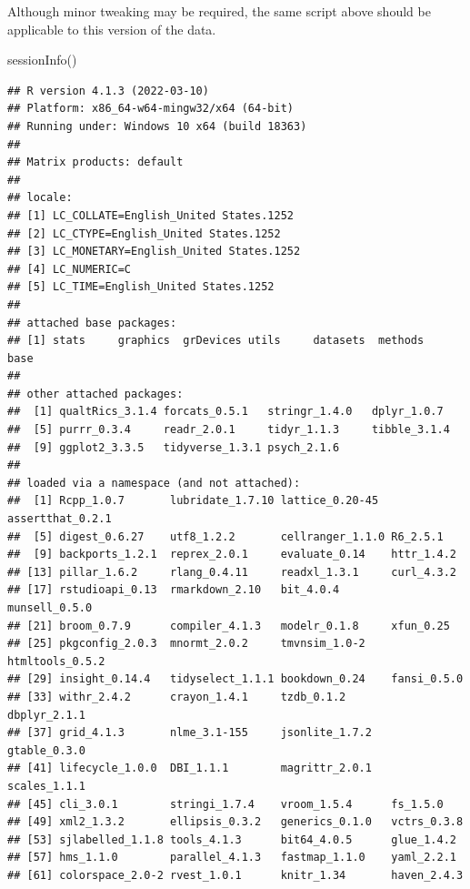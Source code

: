 \documentclass[
]{book}
\newenvironment{Shaded}{\begin{snugshade}}{\end{snugshade}}
\newcommand{\FunctionTok}[1]{\textcolor[rgb]{0.00,0.00,0.00}{#1}}
\newcommand{\NormalTok}[1]{#1}
\begin{document}
Although minor tweaking may be required, the same script above should be applicable to this version of the data.

\begin{Shaded}
\begin{Highlighting}[]
\FunctionTok{sessionInfo}\NormalTok{()}
\end{Highlighting}
\end{Shaded}

\begin{verbatim}
## R version 4.1.3 (2022-03-10)
## Platform: x86_64-w64-mingw32/x64 (64-bit)
## Running under: Windows 10 x64 (build 18363)
## 
## Matrix products: default
## 
## locale:
## [1] LC_COLLATE=English_United States.1252 
## [2] LC_CTYPE=English_United States.1252   
## [3] LC_MONETARY=English_United States.1252
## [4] LC_NUMERIC=C                          
## [5] LC_TIME=English_United States.1252    
## 
## attached base packages:
## [1] stats     graphics  grDevices utils     datasets  methods   base     
## 
## other attached packages:
##  [1] qualtRics_3.1.4 forcats_0.5.1   stringr_1.4.0   dplyr_1.0.7    
##  [5] purrr_0.3.4     readr_2.0.1     tidyr_1.1.3     tibble_3.1.4   
##  [9] ggplot2_3.3.5   tidyverse_1.3.1 psych_2.1.6    
## 
## loaded via a namespace (and not attached):
##  [1] Rcpp_1.0.7       lubridate_1.7.10 lattice_0.20-45  assertthat_0.2.1
##  [5] digest_0.6.27    utf8_1.2.2       cellranger_1.1.0 R6_2.5.1        
##  [9] backports_1.2.1  reprex_2.0.1     evaluate_0.14    httr_1.4.2      
## [13] pillar_1.6.2     rlang_0.4.11     readxl_1.3.1     curl_4.3.2      
## [17] rstudioapi_0.13  rmarkdown_2.10   bit_4.0.4        munsell_0.5.0   
## [21] broom_0.7.9      compiler_4.1.3   modelr_0.1.8     xfun_0.25       
## [25] pkgconfig_2.0.3  mnormt_2.0.2     tmvnsim_1.0-2    htmltools_0.5.2 
## [29] insight_0.14.4   tidyselect_1.1.1 bookdown_0.24    fansi_0.5.0     
## [33] withr_2.4.2      crayon_1.4.1     tzdb_0.1.2       dbplyr_2.1.1    
## [37] grid_4.1.3       nlme_3.1-155     jsonlite_1.7.2   gtable_0.3.0    
## [41] lifecycle_1.0.0  DBI_1.1.1        magrittr_2.0.1   scales_1.1.1    
## [45] cli_3.0.1        stringi_1.7.4    vroom_1.5.4      fs_1.5.0        
## [49] xml2_1.3.2       ellipsis_0.3.2   generics_0.1.0   vctrs_0.3.8     
## [53] sjlabelled_1.1.8 tools_4.1.3      bit64_4.0.5      glue_1.4.2      
## [57] hms_1.1.0        parallel_4.1.3   fastmap_1.1.0    yaml_2.2.1      
## [61] colorspace_2.0-2 rvest_1.0.1      knitr_1.34       haven_2.4.3
\end{verbatim}
\end{document}
